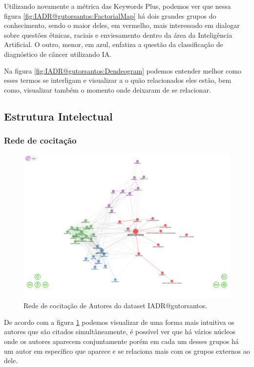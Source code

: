 Utilizando novamente a métrica das Keywords Plus, podemos ver que nessa figura \ref{fig:IADR@gutorsantos:FactorialMap} há dois grandes grupos do conhecimento, sendo o maior deles, em vermelho, mais interessado em dialogar sobre questões étnicas, raciais e enviesamento dentro da área da Inteligência Artificial. O outro, menor, em azul, enfatiza a questão da classificação de diagnóstico de câncer utilizando IA. 

Na figura \ref{fig:IADR@gutorsantos:Dendeogram} podemos entender melhor como esses termos se interligam e visualizar a o quão relacionados eles estão, bem como, visualizar também o momento onde deixaram de se relacionar.


\subsection{Estrutura Intelectual}

\subsubsection{Rede de cocitação}

\begin{figure}[H]
    \centering
\includegraphics[angle=0,width=1\textwidth]{experiments/gutorsantos/AnaliseBibliometrica/IAeDiscriminacao/imgs/CoCitation.png}
    \caption{Rede de cocitação de Autores do dataset IADR@gutorsantos.}
    \label{fig:IADR@gutorsantos:Cocitation}
\end{figure}

De acordo com a figura \ref{fig:IADR@gutorsantos:Cocitation} podemos visualizar de uma forma mais intuitiva os autores que são citados simultâneamente, é possível ver que há vários núcleos onde os autores aparecem conjuntamente porém em cada um desses grupos há um autor em específico que aparece e se relaciona mais com os grupos externos ao dele.

